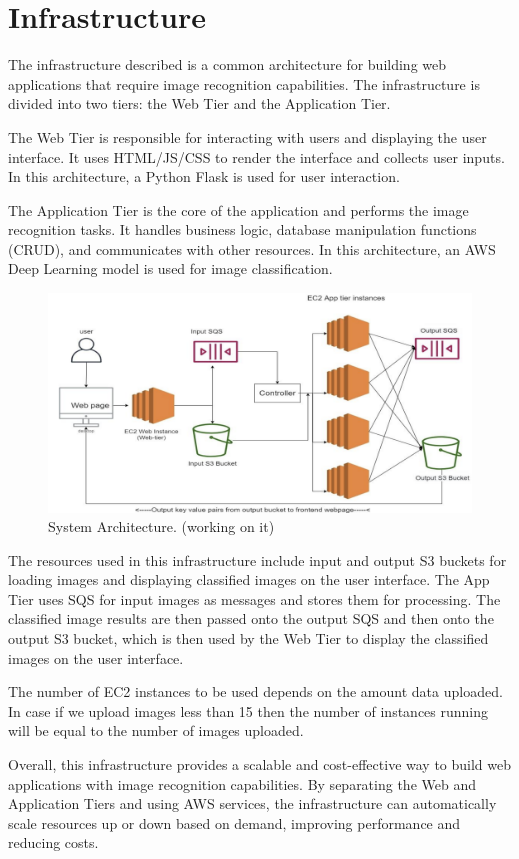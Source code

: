 \documentclass[../main.tex]{subfiles}
\begin{document}
\part*{Infrastructure}
The infrastructure described is a common architecture for building web applications that require image recognition capabilities. The infrastructure is divided into two tiers: the Web Tier and the Application Tier.

The Web Tier is responsible for interacting with users and displaying the user interface. It uses HTML/JS/CSS to render the interface and collects user inputs. In this architecture, a Python Flask is used for user interaction.

The Application Tier is the core of the application and performs the image recognition tasks. It handles business logic, database manipulation functions (CRUD), and communicates with other resources. In this architecture, an AWS Deep Learning model is used for image classification.

\begin{figure}[h!]
\centering
\includegraphics[scale=0.8]{images/arc.png}
\caption{System Architecture. (working on it)}
\label{fig:im_uses}
\end{figure}

The resources used in this infrastructure include input and output S3 buckets for loading images and displaying classified images on the user interface. The App Tier uses SQS for input images as messages and stores them for processing. The classified image results are then passed onto the output SQS and then onto the output S3 bucket, which is then used by the Web Tier to display the classified images on the user interface.

The number of EC2 instances to be used depends on the amount data uploaded. In case if we upload images less than 15 then the number of instances running will be equal to the number of images uploaded.

Overall, this infrastructure provides a scalable and cost-effective way to build web applications with image recognition capabilities. By separating the Web and Application Tiers and using AWS services, the infrastructure can automatically scale resources up or down based on demand, improving performance and reducing costs.
\end{document}
